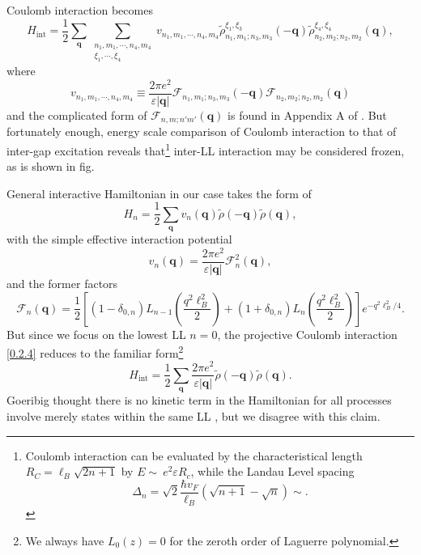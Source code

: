 \documentclass[bachelor,english,numbers]{ustcthesis}
\begin{document}
		Coulomb interaction becomes
		\begin{equation*}
		 	H_{\text{int}}=\dfrac{1}{2}\sum_{\bm{q}}\sum_{\substack{n_1,m_1,\cdots,n_4,m_4\\\xi_1,\cdots,\xi_4}}v_{n_1,m_1,\cdots,n_4,m_4}\widetilde{\rho}_{n_1,m_1;n_3,m_3}^{\xi_1,\xi_3}(\bm{-q})\widetilde{\rho}_{n_2,m_2;n_2,m_2}^{\xi_4,\xi_4}(\bm{q}),
		\end{equation*}
		where
		\begin{equation*}
			v_{n_1,m_1,\cdots,n_4,m_4}\equiv\frac{2\pi e^2}{\varepsilon |\bm{q}|}\mathcal{F}_{n_1,m_1;n_3,m_3}(-\bm{q})\mathcal{F}_{n_2,m_2;n_2,m_2}(\bm{q})
		\end{equation*}
		and the complicated form of $\mathcal{F}_{n,m;n'm'}(\bm{q})$ is found in Appendix A of \cite{goerbig2011electronic}. But fortunately enough, energy scale comparison of Coulomb interaction to that of inter-gap excitation reveals that\footnote{Coulomb interaction can be evaluated by the characteristical length $R_C=\ell_B\sqrt{2n+1}$ by $E\sim\ e^2\varepsilon R_c$, while the Landau Level spacing
		\begin{equation*}
			\Delta_n=\sqrt{2}\dfrac{\hbar v_F}{\ell_B}(\sqrt{n+1}-\sqrt{n})\sim.
		\end{equation*}} inter-LL interaction may be considered frozen, as is shown in 
		fig.\par
		General interactive Hamiltonian in our case takes the form of \cite{nomura2006quantum,goerbig2006electron}
		\begin{equation}\label{0.2.4}
			H_n=\dfrac{1}{2}\sum_{\bm{q}}v_n(\bm{q})\widetilde{\rho}(\bm{-q})\widetilde{\rho}(\bm{q}),  
		\end{equation}
		with the simple effective interaction potential
		\begin{equation*}
			v_n(\bm{q})=\dfrac{2\pi e^2}{\varepsilon|\bm{q}|}\mathcal{F}_n^2(\bm{q}),
		\end{equation*}
		and the former factors
		\begin{equation*}
			\mathcal{F}_n(\bm{q})=\dfrac{1}{2}\left[(1-\delta_{0,n})L_{n-1}\left(\dfrac{q^2\ell_B^2}{2}\right)+(1+\delta_{0,n})L_{n}\left(\dfrac{q^2\ell_B^2}{2}\right)\right]e^{-q^2\ell_B^2/4}.
		\end{equation*}
		But since we focus on the lowest LL $n=0$, the projective Coulomb interaction \eqref{0.2.4} reduces to the familiar form\footnote{We always have $L_0(z)=0$ for the zeroth order of Laguerre polynomial.}
		\begin{equation}\label{0.2.5}
			H_{\text{int}}=\dfrac{1}{2}\sum_{\bm{q}}\dfrac{2\pi e^2}{\varepsilon|\bm{q}|}\widetilde{\rho}(\bm{-q})\widetilde{\rho}(\bm{q}).
		\end{equation}
		Goeribig thought there is no kinetic term in the Hamiltonian for all processes involve merely states within the same LL \cite{goerbig2011electronic}, but we disagree with this claim. 
\iffalse
\end{document}

